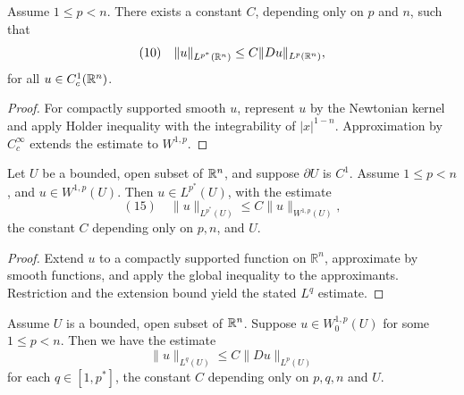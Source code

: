 \begin{theorem}
\label{thm:gagliardo-nirenberg-sobolev-inequality}

Assume $1 \le p < n$. There exists a constant $C$, depending only on $p$ and $n$, such that
$$(10) \quad \|u\|_{L^{p^*}(\mathbb{R}^n)} \le C\|Du\|_{L^p(\mathbb{R}^n)},$$
for all $u \in C_c^1(\mathbb{R}^n)$.
\end{theorem}

\begin{proof}
\sketch For compactly supported smooth $u$, represent $u$ by the Newtonian kernel and apply Holder inequality with the integrability of $|x|^{1-n}$. Approximation by $C_c^\infty$ extends the estimate to $W^{1,p}$.
\end{proof}

\begin{theorem}
\label{thm:sobolev-embedding-w1p-subcritical}

Let $U$ be a bounded, open subset of $\mathbb{R}^n$, and suppose $\partial U$ is $C^1$. Assume $1 \le p < n$, and $u \in W^{1,p}(U)$. Then $u \in L^{p^*}(U)$, with the estimate
$$(15) \quad \|u\|_{L^{p^*}(U)} \le C\|u\|_{W^{1,p}(U)},$$
the constant $C$ depending only on $p, n$, and $U$.
\end{theorem}

\begin{proof}
\sketch Extend $u$ to a compactly supported function on $\mathbb R^n$, approximate by smooth functions, and apply the global inequality to the approximants. Restriction and the extension bound yield the stated $L^q$ estimate.
\end{proof}

\begin{theorem}
\label{thm:poincare-w01p-subcritical}

Assume $U$ is a bounded, open subset of $\mathbb{R}^n$. Suppose $u \in W_0^{1,p}(U)$ for some $1 \le p < n$. Then we have the estimate
$$\|u\|_{L^q(U)} \le C\|Du\|_{L^p(U)}$$
for each $q \in [1, p^*]$, the constant $C$ depending only on $p, q, n$ and $U$.
\end{theorem}

